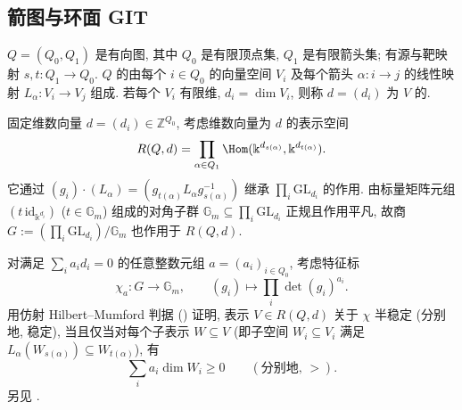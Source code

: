 \subsection{箭图与环面 GIT}\label{src:8.5.3-subsection}
\begin{exercise}[箭图 GIT]\label{src:8.5.6}
 $Q=(Q_0,Q_1)$ 是有向图, 其中 $Q_0$ 是有限顶点集, $Q_1$ 是有限箭头集; 有源与靶映射 $s,t:Q_1\to Q_0$. $Q$ 的由每个 $i\in Q_0$ 的向量空间 $V_i$ 及每个箭头 $\alpha:i\to j$ 的线性映射 $L_\alpha:V_i\to V_j$ 组成. 若每个 $V_i$ 有限维, $d_i=\dim V_i$, 则称 $d=(d_i)$ 为 $V$ 的.

固定维数向量 $d=(d_i)\in\mathbb Z^{Q_0}$, 考虑维数向量为 $d$ 的表示空间
\[
R(Q,d)=\prod_{\alpha\in Q_1}\Hom(\Bbbk^{d_{s(\alpha)}},\Bbbk^{d_{t(\alpha)}}).
\]
它通过 $(g_i)\cdot(L_\alpha)=(g_{t(\alpha)}L_\alpha g_{s(\alpha)}^{-1})$ 继承 $\prod_i\mathrm{GL}_{d_i}$ 的作用. 由标量矩阵元组 $(t\,\mathrm{id}_{\Bbbk^{d_i}})$ ($t\in\mathbb G_m$) 组成的对角子群 $\mathbb G_m\subseteq\prod_i\mathrm{GL}_{d_i}$ 正规且作用平凡, 故商 $G:=(\prod_i\mathrm{GL}_{d_i})/\mathbb G_m$ 也作用于 $R(Q,d)$.

对满足 $\sum_i a_id_i=0$ 的任意整数元组 $a=(a_i)_{i\in Q_0}$, 考虑特征标
\[
\chi_a:G\longrightarrow\mathbb G_m,\qquad(g_i)\longmapsto\prod_i\det(g_i)^{a_i}.
\]
用仿射 Hilbert--Mumford 判据 () 证明, 表示 $V\in R(Q,d)$ 关于 $\chi$ 半稳定 (分别地, 稳定), 当且仅当对每个子表示 $W\subseteq V$ (即子空间 $W_i\subseteq V_i$ 满足 $L_\alpha(W_{s(\alpha)})\subseteq W_{t(\alpha)}$), 有
\[
\sum_i a_i\dim W_i\geq0\qquad(\text{分别地, }>).
\]
另见 \cite[命题 3.1]{Kin94}.
\end{exercise}
